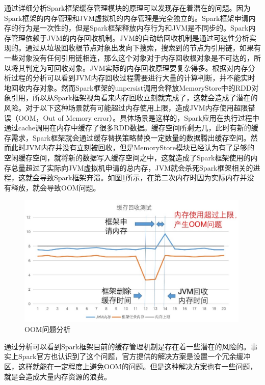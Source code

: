 通过详细分析Spark框架缓存管理模块的原理可以发现存在着潜在的问题。因为Spark框架的内存管理和JVM虚拟机的内存管理是完全独立的。Spark框架申请内存的行为是一次性的，但是Spark框架释放内存行为和JVM是不同步的。Spark内存管理依赖于JVM的内存回收机制。JVM的自动给回收机制是通过可达性分析实现的。通过从垃圾回收根节点对象出发向下搜索，搜索到的节点为引用链，如果有一些对象没有任何引用链相连，那么这个对象对于内存回收根对象是不可达的，所以将其判定为可回收对象。JVM实际的内存回收原理要复杂得多。根据对内存分析过程的分析可以看到JVM内存回收过程需要进行大量的计算判断，并不能实时地回收内存对象。然而Spark框架的unpersist调用会释放MemoryStore中的RDD对象引用，所以从Spark框架视角看来内存回收立刻就完成了，这就会造成了潜在的风险。对于以下这种场景就有可能超过内存使用上限，造成JVM内存使用超限错误（OOM，Out of Memory error）。具体场景是这样的，Spark应用在执行过程中通过cache调用在内存中缓存了很多RDD数据。缓存空间所剩无几，此时有新的缓存需求，Spark框架就会通过缓存替换策略替换一定数量的数据腾出缓存空间。然而此时JVM内存并没有立刻被回收，但是MemoryStore模块已经认为有了足够的空闲缓存空间，就将新的数据写入缓存空间之中，这就造成了Spark框架使用的内存总量超过了实际向JVM虚拟机申请的总内存，JVM就会杀死Spark框架相关的进程，这就会导致Spark框架奔溃。如图\ref{fig:oom}所示，在第二次内存时因为实际内存并没有释放，就会导致OOM问题。

\begin{figure}
    \centering
    \includegraphics[width=0.99\textwidth]{Img/OOM解释.jpg}
    \caption{OOM问题分析}
    \label{fig:oom}
\end{figure}


通过分析可以看到Spark框架目前的缓存管理机制是存在着一些潜在的风险的。事实上Spark官方也认识到了这个问题，官方提供的解决方案是设置一个冗余缓冲区，这样就能在一定程度上避免OOM的问题。但是这种解决方案也有一些问题，就是会造成大量内存资源的浪费。

